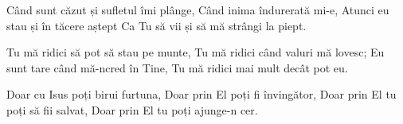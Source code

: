 \beginverse
Când sunt căzut și sufletul îmi plânge,
Când inima îndurerată mi-e,
Atunci eu stau și în tăcere aștept
Ca Tu să vii și să mă strângi la piept.
\endverse

\beginchorus
Tu mă ridici să pot să stau pe munte,
Tu mă ridici când valuri mă lovesc;
Eu sunt tare când mă-ncred în Tine,
Tu mă ridici mai mult decât pot eu.
\endchorus

\beginverse
Doar cu Isus poți birui furtuna,
Doar prin El poți fi învingător,
Doar prin El tu poți să fii salvat,
Doar prin El tu poți ajunge-n cer.
\endverse
\endsong